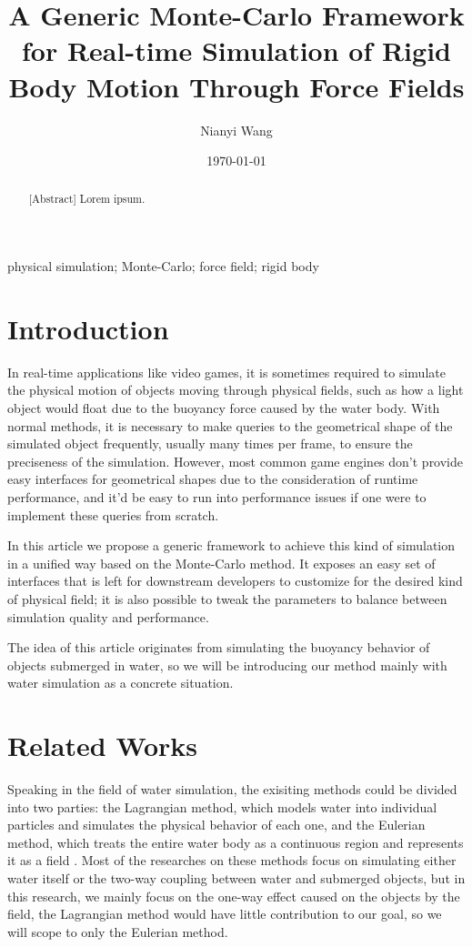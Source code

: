 \documentclass{article}
\title{A Generic Monte-Carlo Framework for Real-time Simulation of Rigid Body Motion Through Force Fields}
\author{Nianyi Wang}
\date{\today}
\begin{document}
\maketitle

\begin{abstract}[Abstract]
	Lorem ipsum.
\end{abstract}

\begin{keywords}
	physical simulation;
	Monte-Carlo;
	force field;
	rigid body
\end{keywords}

\section{Introduction}

In real-time applications like video games, it is sometimes required to simulate the physical motion of objects moving through physical fields, such as how a light object would float due to the buoyancy force caused by the water body.
With normal methods, it is necessary to make queries to the geometrical shape of the simulated object frequently, usually many times per frame, to ensure the preciseness of the simulation.
However, most common game engines don't provide easy interfaces for geometrical shapes due to the consideration of runtime performance, and it'd be easy to run into performance issues if one were to implement these queries from scratch.

In this article we propose a generic framework to achieve this kind of simulation in a unified way based on the Monte-Carlo method.
It exposes an easy set of interfaces that is left for downstream developers to customize for the desired kind of physical field;
it is also possible to tweak the parameters to balance between simulation quality and performance.

The idea of this article originates from simulating the buoyancy behavior of objects submerged in water, so we will be introducing our method mainly with water simulation as a concrete situation.

\section{Related Works}

Speaking in the field of water simulation, the exisiting methods could be divided into two parties: the Lagrangian method, which models water into individual particles and simulates the physical behavior of each one, and the Eulerian method, which treats the entire water body as a continuous region and represents it as a field \cite{GOU09}.
Most of the researches on these methods focus on simulating either water itself or the two-way coupling between water and submerged objects,
but in this research, we mainly focus on the one-way effect caused on the objects by the field, the Lagrangian method would have little contribution to our goal, so we will scope to only the Eulerian method.
\end{document}
